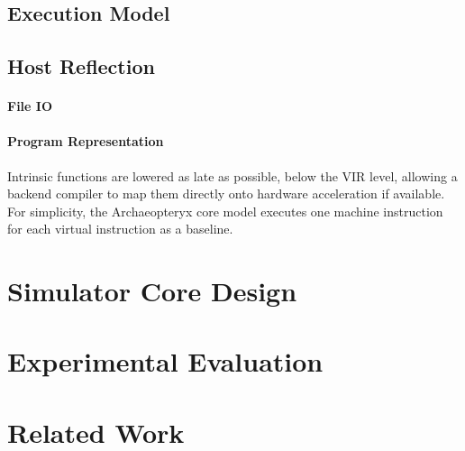 \documentclass[conference, 10pt]{IEEEtran}
\begin{document}
\subsection{Execution Model}

\subsection{Host Reflection}

\paragraph{File IO}

\paragraph{Program Representation}

Intrinsic functions are lowered as late as possible, below the
VIR level, allowing a backend compiler to map them directly onto hardware
acceleration if available.  For simplicity, the Archaeopteryx core model
executes one machine instruction for each virtual instruction as a baseline.

%
%


\section{Simulator Core Design}
\label{sec:core-design}

\section{Experimental Evaluation}
\label{sec:experiments}

\section{Related Work}
\label{related-work}
\end{document}
